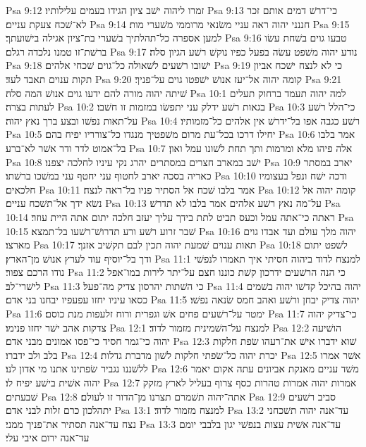 Psa 9:12  זמרו ליהוה ישׁב ציון הגידו בעמים עלילותיו׃
Psa 9:13  כי־דרשׁ דמים אותם זכר לא־שׁכח צעקת עניים׃
Psa 9:14  חננני יהוה ראה עניי משׂנאי מרוממי משׁערי מות׃
Psa 9:15  למען אספרה כל־תהלתיך בשׁערי בת־ציון אגילה בישׁועתך׃
Psa 9:16  טבעו גוים בשׁחת עשׂו ברשׁת־זו טמנו נלכדה רגלם׃
Psa 9:17  נודע יהוה משׁפט עשׂה בפעל כפיו נוקשׁ רשׁע הגיון סלה׃
Psa 9:18  ישׁובו רשׁעים לשׁאולה כל־גוים שׁכחי אלהים׃
Psa 9:19  כי לא לנצח ישׁכח אביון תקות ענוים תאבד לעד׃
Psa 9:20  קומה יהוה אל־יעז אנושׁ ישׁפטו גוים על־פניך׃
Psa 9:21  שׁיתה יהוה מורה להם ידעו גוים אנושׁ המה סלה׃
Psa 10:1  למה יהוה תעמד ברחוק תעלים לעתות בצרה׃
Psa 10:2  בגאות רשׁע ידלק עני יתפשׂו במזמות זו חשׁבו׃
Psa 10:3  כי־הלל רשׁע על־תאות נפשׁו ובצע ברך נאץ יהוה׃
Psa 10:4  רשׁע כגבה אפו בל־ידרשׁ אין אלהים כל־מזמותיו׃
Psa 10:5  יחילו דרכו בכל־עת מרום משׁפטיך מנגדו כל־צורריו יפיח בהם׃
Psa 10:6  אמר בלבו בל־אמוט לדר ודר אשׁר לא־ברע׃
Psa 10:7  אלה פיהו מלא ומרמות ותך תחת לשׁונו עמל ואון׃
Psa 10:8  ישׁב במארב חצרים במסתרים יהרג נקי עיניו לחלכה יצפנו׃
Psa 10:9  יארב במסתר כאריה בסכה יארב לחטוף עני יחטף עני במשׁכו ברשׁתו׃
Psa 10:10  ודכה ישׁח ונפל בעצומיו חלכאים׃
Psa 10:11  אמר בלבו שׁכח אל הסתיר פניו בל־ראה לנצח׃
Psa 10:12  קומה יהוה אל נשׂא ידך אל־תשׁכח עניים׃
Psa 10:13  על־מה נאץ רשׁע אלהים אמר בלבו לא תדרשׁ׃
Psa 10:14  ראתה כי־אתה עמל וכעס תביט לתת בידך עליך יעזב חלכה יתום אתה היית עוזר׃
Psa 10:15  שׁבר זרוע רשׁע ורע תדרושׁ־רשׁעו בל־תמצא׃
Psa 10:16  יהוה מלך עולם ועד אבדו גוים מארצו׃
Psa 10:17  תאות ענוים שׁמעת יהוה תכין לבם תקשׁיב אזנך׃
Psa 10:18  לשׁפט יתום ודך בל־יוסיף עוד לערץ אנושׁ מן־הארץ׃
Psa 11:1  למנצח לדוד ביהוה חסיתי איך תאמרו לנפשׁי נודו הרכם צפור׃
Psa 11:2  כי הנה הרשׁעים ידרכון קשׁת כוננו חצם על־יתר לירות במו־אפל לישׁרי־לב׃
Psa 11:3  כי השׁתות יהרסון צדיק מה־פעל׃
Psa 11:4  יהוה בהיכל קדשׁו יהוה בשׁמים כסאו עיניו יחזו עפעפיו יבחנו בני אדם׃
Psa 11:5  יהוה צדיק יבחן ורשׁע ואהב חמס שׂנאה נפשׁו׃
Psa 11:6  ימטר על־רשׁעים פחים אשׁ וגפרית ורוח זלעפות מנת כוסם׃
Psa 11:7  כי־צדיק יהוה צדקות אהב ישׁר יחזו פנימו׃
Psa 12:1  למנצח על־השׁמינית מזמור לדוד׃
Psa 12:2  הושׁיעה יהוה כי־גמר חסיד כי־פסו אמונים מבני אדם׃
Psa 12:3  שׁוא ידברו אישׁ את־רעהו שׂפת חלקות בלב ולב ידברו׃
Psa 12:4  יכרת יהוה כל־שׂפתי חלקות לשׁון מדברת גדלות׃
Psa 12:5  אשׁר אמרו ללשׁננו נגביר שׂפתינו אתנו מי אדון לנו׃
Psa 12:6  משׁד עניים מאנקת אביונים עתה אקום יאמר יהוה אשׁית בישׁע יפיח לו׃
Psa 12:7  אמרות יהוה אמרות טהרות כסף צרוף בעליל לארץ מזקק שׁבעתים׃
Psa 12:8  אתה־יהוה תשׁמרם תצרנו מן־הדור זו לעולם׃
Psa 12:9  סביב רשׁעים יתהלכון כרם זלות לבני אדם׃
Psa 13:1  למנצח מזמור לדוד׃
Psa 13:2  עד־אנה יהוה תשׁכחני נצח עד־אנה תסתיר את־פניך ממני׃
Psa 13:3  עד־אנה אשׁית עצות בנפשׁי יגון בלבבי יומם עד־אנה ירום איבי עלי׃
